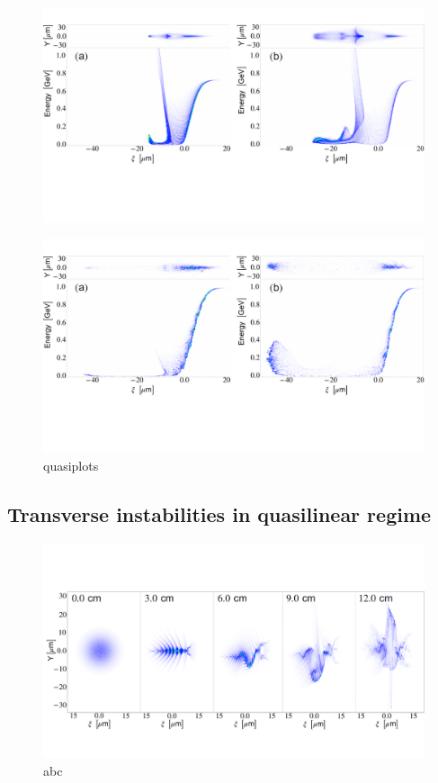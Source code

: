 \begin{figure}
\centering
\includegraphics[width=\textwidth]{linearplots.pdf}
\end{figure}
\begin{figure}
\includegraphics[width=\textwidth]{quasiplots}
\caption{quasiplots}
\end{figure}

\subsection{Transverse instabilities in quasilinear regime}
\begin{figure}
\centering
\includegraphics[width=\textwidth]{CherenkovInstability}
\caption{abc}
\end{figure}
